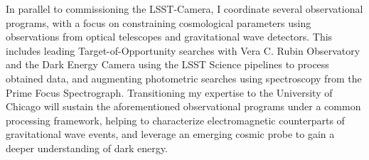 \documentclass[10pt]{article}
\begin{document}

In parallel to commissioning the LSST-Camera, I coordinate several observational programs, with a focus on constraining cosmological parameters using observations from optical telescopes and gravitational wave detectors. This includes leading Target-of-Opportunity searches with Vera C. Rubin Observatory and the Dark Energy Camera using the LSST Science pipelines to process obtained data, and augmenting photometric searches using spectroscopy from the Prime Focus Spectrograph. 
\textcolor{\tcolor}{Transitioning my expertise to the University of Chicago will sustain the aforementioned observational programs under a common processing framework, helping to characterize electromagnetic counterparts of gravitational wave events, and leverage an emerging cosmic probe to gain a deeper understanding of dark energy.}

\end{document}

